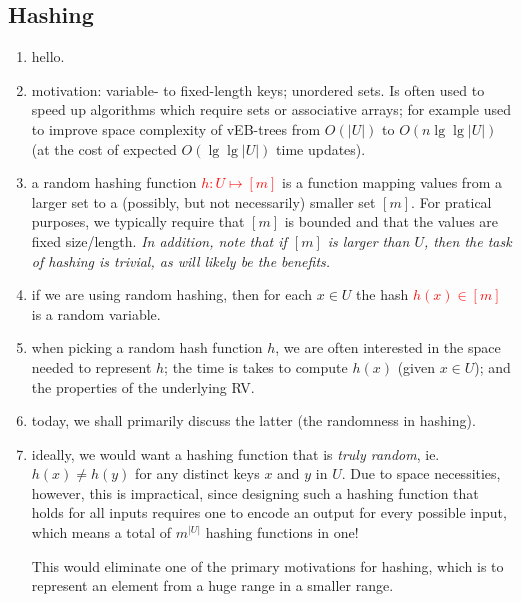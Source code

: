 \newpage
\subsection{Hashing}

\begin{enumerate}
  \item hello.

  \item motivation: variable- to fixed-length keys; unordered sets. Is often
    used to speed up algorithms which require sets or associative arrays; for
    example used to improve space complexity of vEB-trees from $O(|U|)$ to $O(n
    \lg \lg |U|)$ (at the cost of expected $O(\lg \lg |U|)$ time updates).

  \item a random hashing function \textcolor{red}{$h : U \mapsto [m]$} is a
    function mapping values from a larger set to a (possibly, but not
    necessarily) smaller set $[m]$. For pratical purposes, we typically require
    that $[m]$ is bounded and that the values are fixed size/length. \emph{In
    addition, note that if $[m]$ is larger than $U$, then the task of hashing is
    trivial, as will likely be the benefits.}

  \item if we are using random hashing, then for each $x \in U$ the hash
    \textcolor{red}{$h(x) \in [m]$} is a random variable.

  \item when picking a random hash function $h$, we are often interested in the
    space needed to represent $h$; the time is takes to compute $h(x)$ (given $x
    \in U$); and the properties of the underlying RV.

  \item today, we shall primarily discuss the latter (the randomness in
    hashing).

  \item ideally, we would want a hashing function that is \emph{truly random},
    ie. $h(x) \neq h(y)$ for any distinct keys $x$ and $y$ in $U$. Due to space
    necessities, however, this is impractical, since designing such a hashing
    function that holds for all inputs requires one to encode an output for
    every possible input, which means a total of $m^{|U|}$ hashing functions in
    one!

    This would eliminate one of the primary motivations for hashing, which is to
    represent an element from a huge range in a smaller range.


\end{enumerate}
